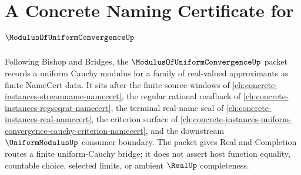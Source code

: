 \chapter{A Concrete Naming Certificate for $\ModulusOfUniformConvergenceUp$}
\label{ch:concrete-instances-modulus-of-uniform-convergence-namecert}

Following Bishop and Bridges, the $\ModulusOfUniformConvergenceUp$ packet records a uniform Cauchy modulus for a family of real-valued approximants as finite NameCert data. It sits after the finite source windows of \autoref{ch:concrete-instances-streamname-namecert}, the regular rational readback of \autoref{ch:concrete-instances-regseqrat-namecert}, the terminal real-name seal of \autoref{ch:concrete-instances-real-namecert}, the criterion surface of \autoref{ch:concrete-instances-uniform-convergence-cauchy-criterion-namecert}, and the downstream $\UniformModulusUp$ consumer boundary. The packet gives Real and Completion routes a finite uniform-Cauchy bridge; it does not assert host function equality, countable choice, selected limits, or ambient $\RealUp$ completeness.

